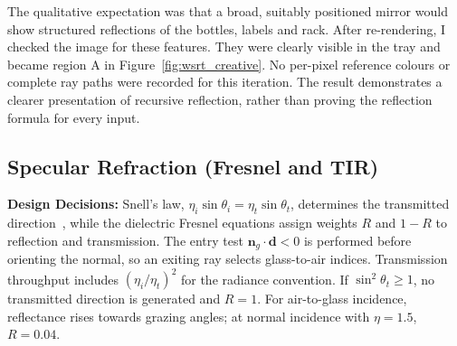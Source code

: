 \documentclass[11pt,a4paper]{article}
\begin{document}
The qualitative expectation was that a broad, suitably positioned mirror would show structured reflections of the bottles, labels and rack. After re-rendering, I checked the image for these features. They were clearly visible in the tray and became region A in Figure~\ref{fig:wsrt_creative}. No per-pixel reference colours or complete ray paths were recorded for this iteration. The result demonstrates a clearer presentation of recursive reflection, rather than proving the reflection formula for every input.

\subsection{Specular Refraction (Fresnel and TIR)}
\textbf{Design Decisions:} Snell's law, \( \eta_i \sin\theta_i = \eta_t \sin\theta_t \), determines the transmitted direction~\cite[Ch.~9, pp.~29--30]{shirley2018}, while the dielectric Fresnel equations assign weights $R$ and $1-R$ to reflection and transmission. The entry test \(\mathbf{n}_g\cdot\mathbf{d}<0\) is performed before orienting the normal, so an exiting ray selects glass-to-air indices. Transmission throughput includes \((\eta_i/\eta_t)^2\) for the radiance convention. If \(\sin^2\theta_t\geq1\), no transmitted direction is generated and $R=1$. For air-to-glass incidence, reflectance rises towards grazing angles; at normal incidence with $\eta=1.5$, $R=0.04$.
\end{document}
